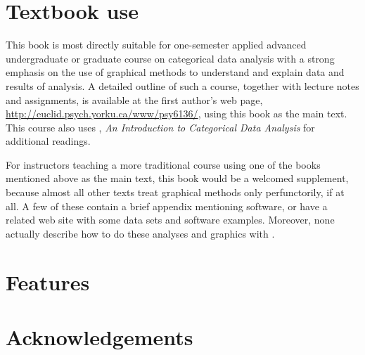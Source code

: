 \section*{Textbook use}
This book is most directly suitable for one-semester applied 
advanced undergraduate or graduate
course on categorical data analysis with a strong emphasis
on the use of graphical methods to understand and explain data and
results of analysis.
A detailed outline of such a course, together with lecture notes
and assignments,
is available at the first author's
web page, \url{http://euclid.psych.yorku.ca/www/psy6136/}, using this
book as the main text.  This course also uses 
\citet{Agresti:2007:ICDA}, \emph{An Introduction to Categorical Data Analysis}
for additional readings.

For instructors teaching a more traditional course using one of the books
mentioned above as the main text, this book would be a welcomed supplement,
because almost all other texts treat graphical methods only perfunctorily,
if at all.
A few of these contain a brief appendix mentioning software, or have
a related web site with some data sets and software examples.
Moreover, none actually describe how to do these analyses and graphics with \R.

\section*{Features}


\section*{Acknowledgements}


